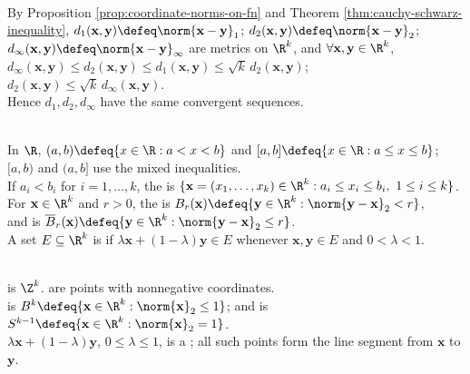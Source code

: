 \begin{example} \label{ex:coordinate-norm-metrics-rk} \\
By Proposition \ref{prop:coordinate-norms-on-fn} and Theorem \ref{thm:cauchy-schwarz-inequality}, $d_1(\mathbf{x},\mathbf{y})\defeq\norm{\mathbf{x}-\mathbf{y}}_1$; $d_2(\mathbf{x},\mathbf{y})\defeq\norm{\mathbf{x}-\mathbf{y}}_2$; $d_\infty(\mathbf{x},\mathbf{y})\defeq\norm{\mathbf{x}-\mathbf{y}}_\infty$ are metrics on $\R^k$, and $\forall \mathbf{x},\mathbf{y}\in\R^k$, $d_\infty(\mathbf{x},\mathbf{y})\leq d_2(\mathbf{x},\mathbf{y})\leq d_1(\mathbf{x},\mathbf{y})\leq \sqrt{k}\,d_2(\mathbf{x},\mathbf{y})$; $d_2(\mathbf{x},\mathbf{y})\leq \sqrt{k}\,d_\infty(\mathbf{x},\mathbf{y})$.\\
Hence $d_1,d_2,d_\infty$ have the same convergent sequences.
\end{example}

\begin{definition} \label{def:euclidean-intervals-cells-balls-convex} \\
In $\R$, $(a,b)\defeq\{x\in\R:a<x<b\}$ and $[a,b]\defeq\{x\in\R:a\leq x\leq b\}$; $[a,b)$ and $(a,b]$ use the mixed inequalities.\\
If $a_i<b_i$ for $i=1,\ldots,k$, the  is $\{\mathbf{x}=(x_1,\ldots,x_k)\in\R^k:a_i\leq x_i\leq b_i,\ 1\leq i\leq k\}$.\\
For $\mathbf{x}\in\R^k$ and $r>0$, the  is $B_r(\mathbf{x})\defeq\{\mathbf{y}\in\R^k:\norm{\mathbf{y}-\mathbf{x}}_2<r\}$,\\
and  is $\overline{B}_r(\mathbf{x})\defeq\{\mathbf{y}\in\R^k:\norm{\mathbf{y}-\mathbf{x}}_2\leq r\}$.\\
A set $E\subseteq\R^k$ is  if $\lambda\mathbf{x}+(1-\lambda)\mathbf{y}\in E$ whenever $\mathbf{x},\mathbf{y}\in E$ and $0<\lambda<1$.
\end{definition}

\begin{remark} \label{rem:euclidean-vocabulary-from-linear-algebra} \\
 is $\Z^k$.  are points with nonnegative coordinates.\\
 is $B^k\defeq\{\mathbf{x}\in\R^k:\norm{\mathbf{x}}_2\leq1\}$; and  is $S^{k-1}\defeq\{\mathbf{x}\in\R^k:\norm{\mathbf{x}}_2=1\}$.\\
$\lambda\mathbf{x}+(1-\lambda)\mathbf{y}$, $0\leq\lambda\leq1$, is a ; all such points form the line segment from $\mathbf{x}$ to $\mathbf{y}$.
\end{remark}

